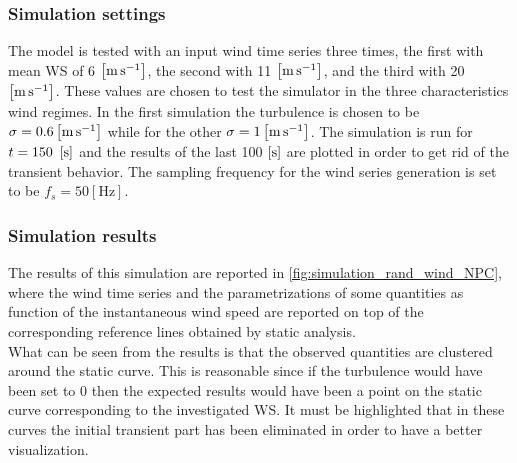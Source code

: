 \subsubsection{Simulation settings}
The model is tested with an input wind time series three times, the first with mean \acrshort{WS} of 6 $\left[\si{\meter\per\second}\right]$, the second with  11 $\left[\si{\meter\per\second}\right]$, and the third with 20 $\left[\si{\meter\per\second}\right]$. These values are chosen to test the simulator in the three characteristics wind regimes. In the first simulation the turbulence is chosen to be $\sigma=0.6 \left[\si{\meter\per\second}\right]$ while for the other $\sigma=1 \left[\si{\meter\per\second}\right]$. The simulation is run for $t=150\ \left[\si{\second}\right]$ and the results of the last 100 $\left[\si{\second}\right]$ are plotted in order to get rid of the transient behavior. The sampling frequency for the wind series generation is set to be $f_s=50 \left[\si{\hertz}\right]$.

\subsubsection{Simulation results}
The results of this simulation are reported in \autoref{fig:simulation_rand_wind_NPC}, where the wind time series and the parametrizations of some quantities as function of the instantaneous wind speed are reported on top of the corresponding reference lines obtained by static analysis. \\
What can be seen from the results is that the observed quantities are clustered around the static curve. This is reasonable since if the turbulence would have been set to 0 then the expected results would have been a point on the static curve corresponding to the investigated WS. It must be highlighted that in these curves the initial transient part has been eliminated in order to have a better visualization. 

